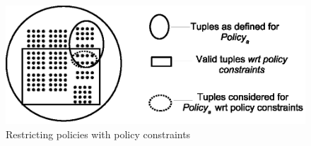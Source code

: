 
 	\begin{figure}
 		\centering
 		\includegraphics[width=1\textwidth]{ABAC16/tuples-vs-valid-tuples}
 		\caption{Restricting policies with policy constraints}
 		\label{fig:tuples-vs-valid-tuples}
 	\end{figure}